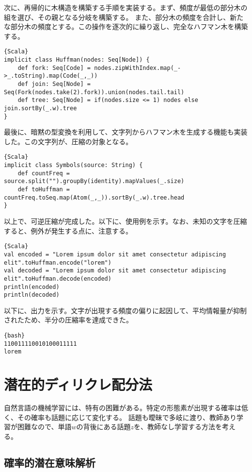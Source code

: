 \documentclass[10pt,a4paper]{book}
\begin{document}
次に、再帰的に木構造を構築する手順を実装する。まず、頻度が最低の部分木の組を選び、その親となる分岐を構築する。
また、部分木の頻度を合計し、新たな部分木の頻度とする。この操作を逐次的に繰り返し、完全なハフマン木を構築する。

\begin{Verbatim}{Scala}
implicit class Huffman(nodes: Seq[Node]) {
	def fork: Seq[Code] = nodes.zipWithIndex.map(_->_.toString).map(Code(_,_))
	def join: Seq[Node] = Seq(Fork(nodes.take(2).fork)).union(nodes.tail.tail)
	def tree: Seq[Node] = if(nodes.size <= 1) nodes else join.sortBy(_.w).tree
}
\end{Verbatim}

最後に、暗黙の型変換を利用して、文字列からハフマン木を生成する機能も実装した。この文字列が、圧縮の対象となる。

\begin{Verbatim}{Scala}
implicit class Symbols(source: String) {
	def countFreq = source.split("").groupBy(identity).mapValues(_.size)
	def toHuffman = countFreq.toSeq.map(Atom(_,_)).sortBy(_.w).tree.head
}
\end{Verbatim}

以上で、可逆圧縮が完成した。以下に、使用例を示す。なお、未知の文字を圧縮すると、例外が発生する点に、注意する。

\begin{Verbatim}{Scala}
val encoded = "Lorem ipsum dolor sit amet consectetur adipiscing elit".toHuffman.encode("lorem")
val decoded = "Lorem ipsum dolor sit amet consectetur adipiscing elit".toHuffman.decode(encoded)
println(encoded)
println(decoded)
\end{Verbatim}

以下に、出力を示す。文字が出現する頻度の偏りに起因して、平均情報量が抑制されたため、半分の圧縮率を達成できた。

\begin{Verbatim}{bash}
110011110010100011111
lorem
\end{Verbatim}

\chapter{潜在的ディリクレ配分法}

自然言語の機械学習には、特有の困難がある。特定の形態素が出現する確率は低く、その確率も話題に応じて変化する。
話題も曖昧で多岐に渡り、教師あり学習が困難なので、単語$w$の背後にある話題$z$を、教師なし学習する方法を考える。

\section{確率的潜在意味解析\label{sect:lda}}
\end{document}
